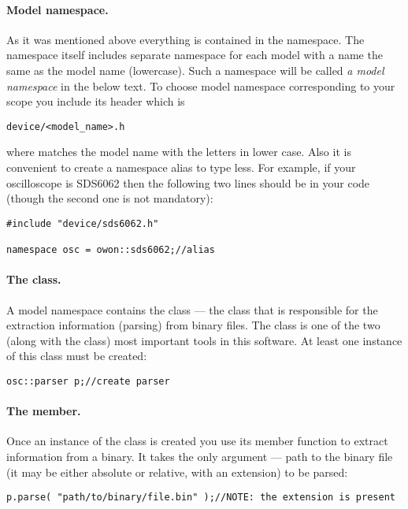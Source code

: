 \paragraph*{Model namespace.}
As it was mentioned above everything is contained in the  namespace.
The  namespace itself includes separate namespace for each model with
a name the same as the model name (lowercase). Such a namespace will be called
\emph{a model namespace} in the below text. To choose model namespace corresponding
to your scope you include its header which is
\begin{lstlisting}
device/<model_name>.h
\end{lstlisting}
where  matches the model name with the letters in lower case.
Also it is convenient to create a namespace alias to type less. For example, if your
oscilloscope is SDS6062 then the following two lines should be in your code (though the second one is not mandatory):
\begin{lstlisting}
#include "device/sds6062.h"

namespace osc = owon::sds6062;//alias
\end{lstlisting}

\paragraph*{The  class.}A model namespace contains the  class --- the class that is responsible
for the extraction information (parsing) from binary files. The  class is
one of the two (along with the  class) most important tools in this
software. At least one instance of this class must be created:
\begin{lstlisting}
osc::parser p;//create parser
\end{lstlisting}

\paragraph{The  member.} Once an instance of the  class
is created you use its member function  to extract information from a binary.
It takes the only argument --- path to the binary file (it may be either absolute or relative,
with an extension) to be parsed:
\begin{lstlisting}
p.parse( "path/to/binary/file.bin" );//NOTE: the extension is present
\end{lstlisting}
